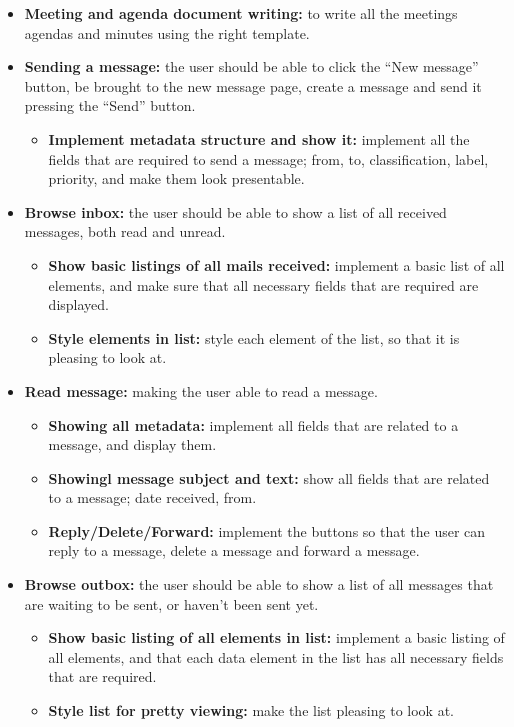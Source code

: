 \begin{itemize}
\begin{itemize}
\end{itemize}
\item{}\textbf{Meeting and agenda document writing:} to write all the meetings agendas and minutes using the right template.
\item{}\textbf{Sending a message:} the user should be able to click the “New message” button, be brought to the new message page, create a message and send it pressing the “Send” button.
\begin{itemize}
\item{}\textbf{Implement metadata structure and show it:} implement all the fields that are required to send a message; from, to, classification, label, priority, and make them look presentable.
\end{itemize}
\item{}\textbf{Browse inbox:} the user should be able to show a list of all received messages, both read and unread.
\begin{itemize}
\item{}\textbf{Show basic listings of all mails received:} implement a basic list of all elements, and make sure that all necessary fields that are required are displayed.
\item{}\textbf{Style elements in list:} style each element of the list, so that it is pleasing to look at.
\end{itemize}
\item{}\textbf{Read message:} making the user able to read a message.
\begin{itemize}
\item{}\textbf{Showing all metadata:} implement all fields that are related to a message, and display them.
\item{}\textbf{Showingl message subject and text:} show all fields that are related to a message; date received, from.
\item{}\textbf{Reply/Delete/Forward:} implement the buttons so that the user can reply to a message, delete a message and forward a message.
\end{itemize}
\item{}\textbf{Browse outbox:} the user should be able to show a list of all messages that are waiting to be sent, or haven’t been sent yet.
\begin{itemize}
\item{}\textbf{Show basic listing of all elements in list:} implement a basic listing of all elements, and that each data element in the list has all necessary fields that are required.
\item{}\textbf{Style list for pretty viewing:} make the list pleasing to look at.

\end{itemize}
\end{itemize}
